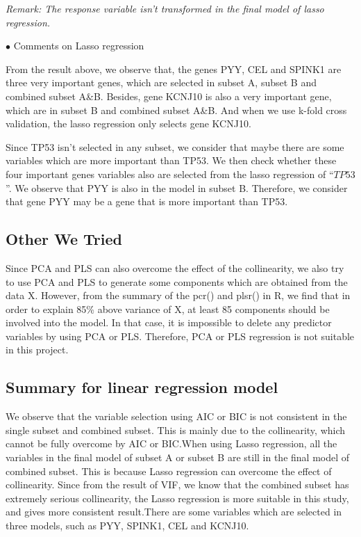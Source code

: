 \documentclass[conference,letterpaper]{IEEEtran}
\begin{document}
 \emph {Remark: The response variable isn't transformed in the final model of lasso regression. }

$\bullet$ {\fontsize{11}{13}\selectfont Comments on Lasso regression}

{\fontsize{11}{13}\selectfont From the result above, we observe that, the genes PYY, CEL and SPINK1 are three very important genes, which  are selected in subset A, subset B and combined subset A\&B. Besides, gene KCNJ10 is also a very important gene, which are in subset B and combined subset A\&B. And when we use k-fold cross validation, the lasso regression only selects gene KCNJ10. 

Since TP53 isn't selected in any subset, we consider that maybe there are some variables which are more important than TP53. We then check whether  these four important genes variables also are selected from the lasso regression of ``$TP53$''. We observe that PYY is also in the model in subset B. Therefore, we consider that gene PYY may be a gene that is more important than TP53.
}

\subsection{{\fontsize{11}{13}\selectfont Other We Tried}}
{\fontsize{11}{13}\selectfont Since PCA and PLS can also overcome the effect of the collinearity, we also try to use PCA and PLS to generate some components which are obtained from the data X. However, from the summary of the pcr() and plsr() in R, we find that in order to explain 85\% above  variance of X, at least 85 components should be involved into the model. In that case, it is impossible to delete any predictor variables by using PCA or PLS. Therefore, PCA or PLS regression is not suitable in this project.
}

\subsection{{\fontsize{11}{13}\selectfont Summary for linear regression model}}
{\fontsize{11}{13}\selectfont We observe that the variable selection using AIC or BIC is not consistent in the single subset and combined subset. This is mainly due to the collinearity, which cannot be fully overcome by AIC or BIC.When using Lasso regression, all the variables in the final model of subset A or subset B are still in the final model of combined subset. This is because Lasso regression can overcome the effect of collinearity. Since from the result of VIF, we know that the combined subset has extremely serious collinearity, the Lasso regression is more suitable in this study, and gives more consistent result.There are some variables which are selected in three models, such as PYY, SPINK1, CEL and KCNJ10.
}
\end{document}
